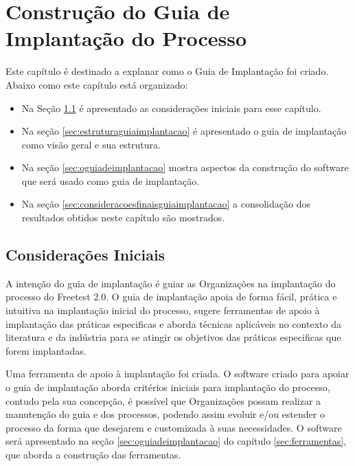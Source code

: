 \chapter{Construção do Guia de Implantação do Processo}
\label{sec:construcaoguiaimplantacao}

Este capítulo é destinado a explanar como o Guia de Implantação foi criado. Abaixo como este capítulo está organizado:

\begin{itemize}
\item Na Seção \ref{sec:consideracoesiniciais} é apresentado as considerações iniciais para esse capítulo.
\item Na seção \ref{sec:estruturaguiaimplantacao} é apresentado o guia de implantação como visão geral e sua estrutura.
\item Na seção \ref{sec:oguiadeimplantacao} mostra aspectos da construção do software que será usado como guia de implantação.
\item Na seção \ref{sec:consideracoesfinaisguiaimplantacao} a consolidação dos resultados obtidos neste capítulo são mostrados.
\end{itemize}

\section{Considerações Iniciais}
\label{sec:consideracoesiniciais}

A intenção do guia de implantação é guiar as Organizações na implantação do processo do Freetest 2.0. O guia de implantação apoia de forma fácil, prática e intuitiva na implantação inicial do processo, sugere ferramentas de apoio à implantação das práticas especificas e aborda técnicas aplicáveis no contexto da literatura e da indústria para se atingir os objetivos das práticas especificas que forem implantadas.

Uma ferramenta de apoio à implantação foi criada. O software criado para apoiar o guia de implantação aborda critérios iniciais para implantação do processo, contudo pela sua concepção, é possível que Organizações possam realizar a manutenção do guia e dos processos, podendo assim evoluir e/ou estender o processo da forma que desejarem e customizada à suas necessidades. O software será apresentado na seção \ref{sec:oguiadeimplantacao} do capítulo \ref{sec:ferramentas}, que aborda a construção das ferramentas.


